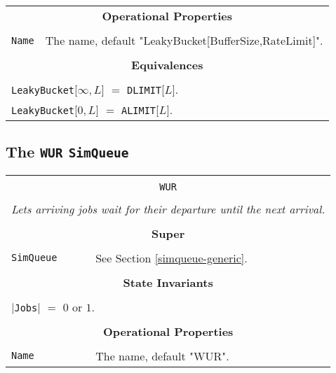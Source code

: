 \documentclass[12pt]{book}
\begin{document}
\begin{tabular}{|l|l|l|l|}
\multicolumn{4}{|c|}{\bf Operational Properties} \\
\multicolumn{4}{|c|}{} \\
\hline
\multicolumn{3}{|l|}{\lstinline|Name|} & The name, default "LeakyBucket[BufferSize,RateLimit]". \\
\hline
\multicolumn{4}{|c|}{} \\
\multicolumn{4}{|c|}{\bf Equivalences} \\
\multicolumn{4}{|c|}{} \\
\hline
\multicolumn{4}{|l|}{\lstinline|LeakyBucket|[$\infty, L$] $=$ \lstinline|DLIMIT|[$L$].} \\
\multicolumn{4}{|l|}{\lstinline|LeakyBucket|[$0, L$] $=$ \lstinline|ALIMIT|[$L$].} \\
\hline
\end{tabular}

\subsection{The \lstinline{WUR} \lstinline{SimQueue}}

\begin{tabular}{|l|l|l|l|}
\hline
\multicolumn{4}{|c|}{} \\
\multicolumn{4}{|c|}{\lstinline[basicstyle=\large]{WUR}} \\
\multicolumn{4}{|c|}{} \\
\hline
\multicolumn{4}{|l|}{\em Lets arriving jobs wait for their departure until the next arrival.} \\
\hline
\multicolumn{4}{|c|}{} \\
\multicolumn{4}{|c|}{\bf Super} \\
\multicolumn{4}{|c|}{} \\
\hline
\lstinline|SimQueue| & \multicolumn{3}{|l|}{See Section \ref{simqueue-generic}.} \\
\hline
\multicolumn{4}{|c|}{} \\
\multicolumn{4}{|c|}{\bf State  Invariants} \\
\multicolumn{4}{|c|}{} \\
\hline
\multicolumn{4}{|l|}{$|$\lstinline|Jobs|$|$ $=$ $0$ or $1$.} \\
\hline
\multicolumn{4}{|c|}{} \\
\multicolumn{4}{|c|}{\bf Operational Properties} \\
\multicolumn{4}{|c|}{} \\
\hline
\multicolumn{3}{|l|}{\lstinline|Name|} & The name, default "WUR". \\
\hline
\end{tabular}
\end{document}
